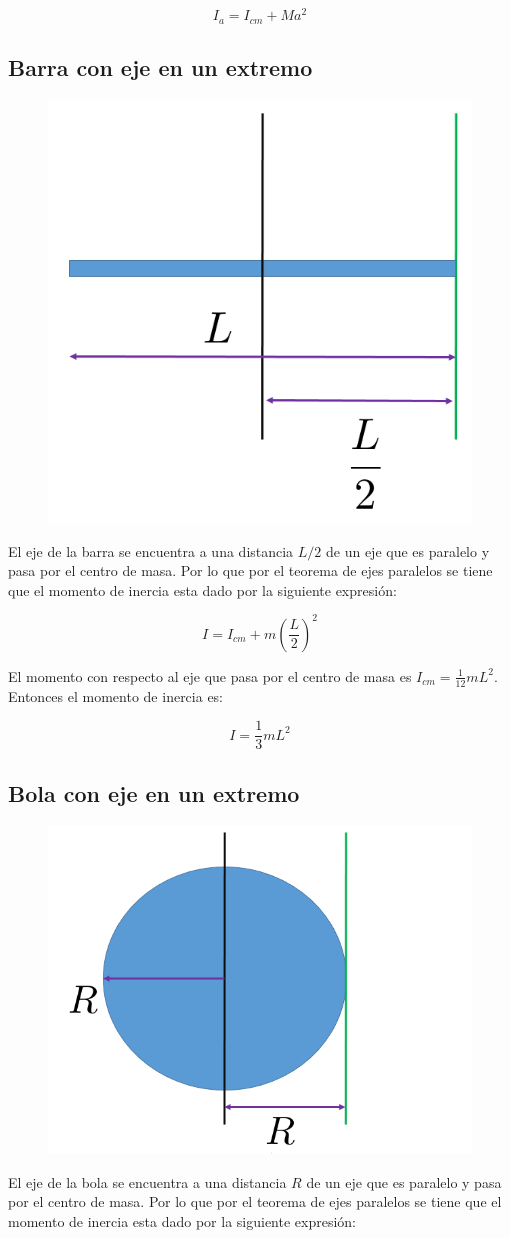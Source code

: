 \documentclass[a4paper,11pt]{article}
\theoremstyle{mytheor}
\begin{document}
 $$ I_{a} = I_{cm} + M a^2$$


\subsection{Barra con eje en un extremo}

\begin{figure}[h]
	\includegraphics[width=0.4\linewidth]{paralelobarra}
	\label{fcN4}
\end{figure}

El eje de la barra se encuentra a una distancia $L/2$ de un eje que es paralelo y pasa por el centro de masa. Por lo que por el teorema de ejes paralelos se tiene que el momento de inercia esta dado por la siguiente expresión:

$$ I = I_{cm} + m \left(\frac{L}{2}\right)^2$$



El momento con respecto al eje que pasa por el centro de masa es $I_{cm} =\frac{1}{12} m L^2$. Entonces el momento de inercia es:

$$ I = \frac{1}{3} m L^2$$

\subsection{Bola con eje en un extremo}

\begin{figure}[h]
	\includegraphics[width=0.4\linewidth]{paralelobola}
	\label{fcN4}
\end{figure}

El eje de la bola se encuentra a una distancia $R$ de un eje que es paralelo y pasa por el centro de masa. Por lo que por el teorema de ejes paralelos se tiene que el momento de inercia esta dado por la siguiente expresión:
\end{document}
